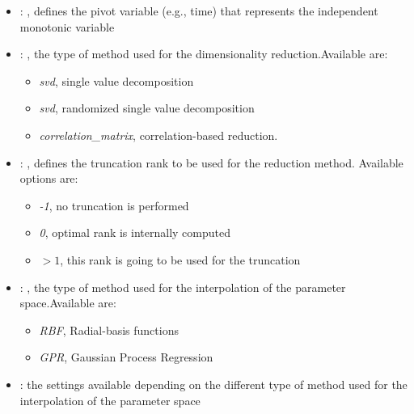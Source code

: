 \begin{itemize}
    \item {}: ,
      defines the pivot variable (e.g., time) that represents the
      independent monotonic variable

    \item {}: ,
      the type of method used for the dimensionality reduction.Available are:
      \begin{itemize}                                                     \item \textit{svd}, single
      value decomposition                                                     \item \textit{svd},
      randomized single value decomposition
      \item \textit{correlation\_matrix}, correlation-based reduction.
      \end{itemize}

    \item {}: ,
      defines the truncation rank to be used for the reduction method.
      Available options are:                                                  \begin{itemize}
      \item \textit{-1}, no truncation is performed
      \item \textit{0}, optimal rank is internally computed
      \item \textit{$>1$}, this rank is going to be used for the truncation
      \end{itemize}

    \item {}: ,
      the type of method used for the interpolation of the parameter space.Available are:
      \begin{itemize}                                                     \item \textit{RBF},
      Radial-basis functions                                                     \item \textit{GPR},
      Gaussian Process Regression                                                   \end{itemize}

    \item {}:
      the settings available depending on the different type of method used for the interpolation of
      the parameter space


\end{itemize}
